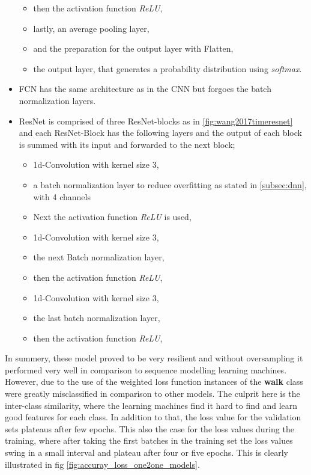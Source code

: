 \begin{itemize}
\begin{itemize}
					\item then the activation function \textit{ReLU},
					\item lastly, an average pooling layer,
					\item and the preparation for the output layer with Flatten,
					\item the output layer, that generates a probability distribution using \textit{softmax}.
				\end{itemize}
			\item FCN has the same architecture as in the CNN but forgoes the batch normalization layers.
			\item ResNet is comprised of three ResNet-blocks as in \ref{fig:wang2017timeresnet} and each ResNet-Block has the following layers and the output of each block is summed with its input and forwarded to the next block;
				\begin{itemize}
					\item 1d-Convolution with kernel size 3,
					\item a batch normalization layer to reduce overfitting as stated in \ref{subsec:dnn}, with 4 channels
					\item Next the activation function \textit{ReLU} is used,
					\item 1d-Convolution with kernel size 3,
					\item the next Batch normalization layer,
					\item then the activation function \textit{ReLU},
					\item 1d-Convolution with kernel size 3,
					\item the last batch normalization layer,
					\item then the activation function \textit{ReLU},
				\end{itemize}
		\end{itemize}
		In summery, these model proved to be very resilient and without oversampling it performed very well in comparison to sequence modelling learning machines. However, due to the use of the weighted loss function instances of the \textbf{walk} class were greatly misclassified in comparison to other models. The culprit here is the inter-class similarity, where the learning machines find it hard to find and learn good features for each class. In addition to that, the loss value for the validation sets plateaus after few epochs. This also the case for the loss values during the training, where after taking the first batches in the training set the loss values swing in a small interval and plateau after four or five epochs. This is clearly illustrated in fig \ref{fig:accuray_loss_one2one_models}.\newline
